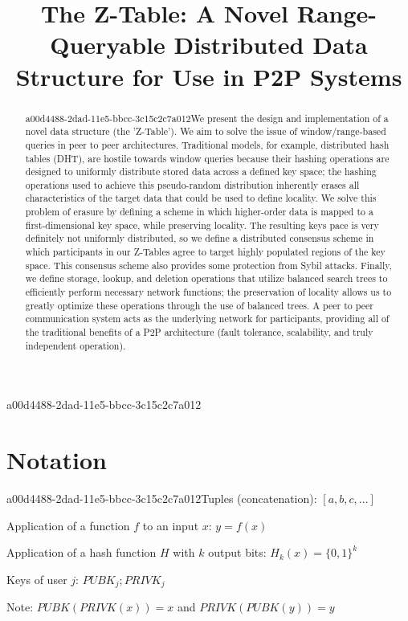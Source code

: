 \documentclass[12pt]{article}
\title{The Z-Table: A Novel Range-Queryable Distributed Data Structure for Use in P2P Systems}
\begin{document}
\maketitle

\begin{abstract}
a00d4488-2dad-11e5-bbcc-3c15c2c7a012We present the design and implementation of a novel data structure (the 'Z-Table'). We aim to solve the issue of window/range-based queries in peer to peer architectures. Traditional models, for example,  distributed hash tables (DHT), are hostile towards window queries because their hashing operations are designed to uniformly distribute stored data across a defined key space; the hashing operations used to achieve this pseudo-random distribution inherently erases all characteristics of the target data that could be used to define locality. We solve this problem of erasure by defining a scheme in which higher-order data is mapped to a first-dimensional key space, while preserving locality. The resulting keys pace is very definitely not uniformly distributed, so we define a distributed consensus scheme in which participants in our Z-Tables agree to target highly populated regions of the key space. This consensus scheme also provides some protection from Sybil attacks. Finally, we define storage, lookup, and deletion operations that utilize balanced search trees to efficiently perform necessary network functions; the preservation of locality allows us to greatly optimize these operations through the use of balanced trees. A peer to peer communication system acts as the underlying network for participants, providing all of the traditional benefits of a P2P architecture (fault tolerance, scalability, and truly independent operation).
\end{abstract}

a00d4488-2dad-11e5-bbcc-3c15c2c7a012\section{Notation}

a00d4488-2dad-11e5-bbcc-3c15c2c7a012Tuples (concatenation): $[a,b,c,...]$

Application of a function $f$ to an input $x$: $y=f(x)$

Application of a hash function $H$ with $k$ output bits: $H_{k}(x) = \{0,1\}^k$

Keys of user $j$: $ PUBK_j; PRIVK_j $

Note: $PUBK(PRIVK(x)) = x$ and $PRIVK(PUBK(y)) = y$~
\end{document}
